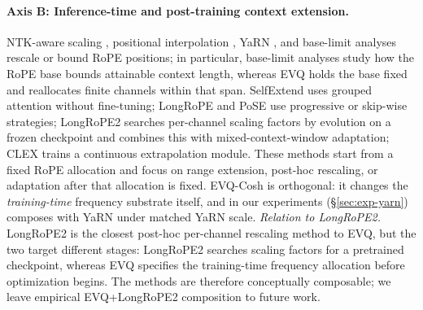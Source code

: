 \paragraph{Axis B: Inference-time and post-training context extension.}
NTK-aware scaling \citep{roziere2023codellama}, positional interpolation \citep{chen2024position}, YaRN \citep{peng2024yarn}, and base-limit analyses \citep{xu2024base} rescale or bound RoPE positions; in particular, base-limit analyses study how the RoPE base bounds attainable context length, whereas EVQ holds the base fixed and reallocates finite channels within that span. SelfExtend \citep{jin2024selfextend} uses grouped attention without fine-tuning; LongRoPE \citep{ding2024longrope} and PoSE \citep{zhu2024pose} use progressive or skip-wise strategies; LongRoPE2 \citep{shang2025longrope2} searches per-channel scaling factors by evolution on a frozen checkpoint and combines this with mixed-context-window adaptation; CLEX \citep{chen2024clex} trains a continuous extrapolation module. These methods start from a fixed RoPE allocation and focus on range extension, post-hoc rescaling, or adaptation after that allocation is fixed. EVQ-Cosh is orthogonal: it changes the \emph{training-time} frequency substrate itself, and in our experiments (\S\ref{sec:exp-yarn}) composes with YaRN under matched YaRN scale. \emph{Relation to LongRoPE2.} LongRoPE2 is the closest post-hoc per-channel rescaling method to EVQ, but the two target different stages: LongRoPE2 searches scaling factors for a pretrained checkpoint, whereas EVQ specifies the training-time frequency allocation before optimization begins. The methods are therefore conceptually composable; we leave empirical EVQ+LongRoPE2 composition to future work.


